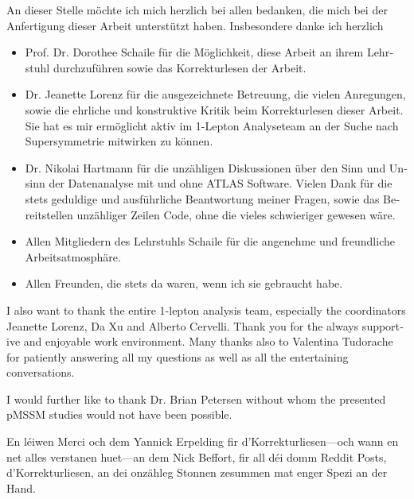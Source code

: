 
\begin{acknowledgements}[Acknowledgements]  




\begin{otherlanguage}{ngerman} 
An dieser Stelle möchte ich mich herzlich bei allen bedanken, die mich bei der Anfertigung dieser Arbeit unterstützt haben. Insbesondere danke ich herzlich
\begin{itemize}
	\item Prof.\@\xspace Dr.\@\xspace Dorothee Schaile für die Möglichkeit, diese Arbeit an ihrem Lehrstuhl durchzuführen sowie das Korrekturlesen der Arbeit. 
	\item Dr.\@\xspace Jeanette Lorenz für die ausgezeichnete Betreuung, die vielen Anregungen, sowie die ehrliche und konstruktive Kritik beim Korrekturlesen dieser Arbeit. Sie hat es mir ermöglicht aktiv im 1-Lepton Analyseteam an der Suche nach Supersymmetrie mitwirken zu können.  
	\item Dr.\@\xspace Nikolai Hartmann für die unzähligen Diskussionen über den Sinn und Unsinn der Datenanalyse mit und ohne ATLAS Software. Vielen Dank für die stets geduldige und ausführliche Beantwortung meiner Fragen, sowie das Bereitstellen unzähliger Zeilen Code, ohne die vieles schwieriger gewesen wäre. 
	\item Allen Mitgliedern des Lehrstuhls Schaile für die angenehme und freundliche Arbeitsatmosphäre.
	\item Allen Freunden, die stets da waren, wenn ich sie gebraucht habe.
\end{itemize}
\end{otherlanguage}  
\begin{otherlanguage}{british} 
I also want to thank the entire 1-lepton analysis team, especially the coordinators Jeanette Lorenz, Da Xu and Alberto Cervelli. Thank you for the always supportive and enjoyable work environment. Many thanks also to Valentina Tudorache for patiently answering all my questions as well as all the entertaining conversations.

I would further like to thank Dr.\@\xspace Brian Petersen without whom the presented pMSSM studies would not have been possible.

\end{otherlanguage}  

En léiwen Merci och dem Yannick Erpelding fir d'Korrekturliesen---och wann en net alles verstanen huet---an dem Nick Beffort, fir all déi domm Reddit Posts, d'Korrekturliesen, an dei onzähleg Stonnen zesummen mat enger Spezi an der Hand. 


\end{acknowledgements}
